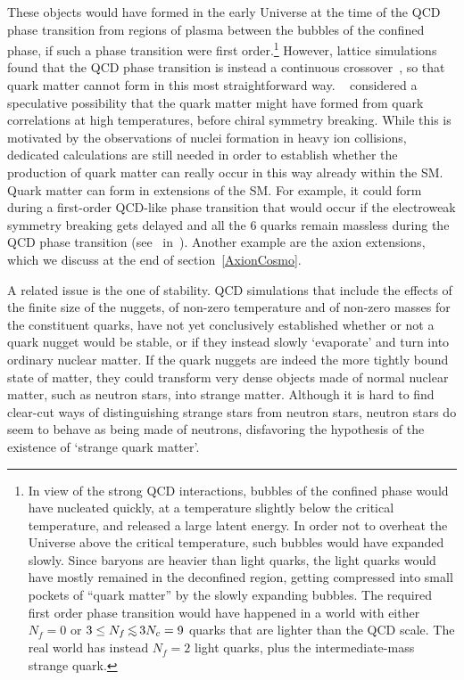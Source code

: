 These objects would have formed in the early Universe at the time of the QCD phase transition from regions of plasma between the bubbles of the confined phase, if such a phase transition were first order.\footnote{In view of the strong QCD interactions,
bubbles of the confined phase
would have nucleated quickly, at a temperature slightly below the critical temperature,
and released a large latent energy. In order not to overheat the Universe above  
the critical temperature, such bubbles would have expanded slowly.
Since baryons are heavier than light quarks, the light quarks would have mostly remained in the 
deconfined region, getting compressed into small pockets of ``quark matter'' by the slowly expanding bubbles.
The required first order phase transition would have happened in a world with either
 $N_f=0$ or $3\le N_f \circa{<}3N_c=9$ quarks that are lighter than the QCD scale.
The real world has instead $N_f=2$ light quarks, plus the intermediate-mass strange quark.}
However, lattice simulations found that the QCD phase transition is instead a continuous crossover~\cite{QballsBis}, so that quark matter cannot form in this most straightforward way. 
~\cite{QballsBis} considered a speculative possibility 
that the quark matter might have formed from quark correlations at high temperatures, before chiral symmetry breaking.
While this is motivated by the observations of nuclei formation in heavy ion collisions, dedicated calculations are still needed in order to establish whether the production of quark matter can really occur in this way already within the SM.
Quark matter can form in extensions of the SM.  For example, it could form during a first-order QCD-like phase transition that would occur if the
electroweak symmetry breaking gets delayed and all the 6 quarks remain massless during the QCD phase transition
(see ~in~\cite{QballsBis}). Another example are 
the axion extensions, which we discuss at the end of section~\ref{AxionCosmo}.

 


A related issue is the one of stability.
QCD simulations that include the effects of the finite size of the nuggets, of non-zero temperature and of non-zero masses for the constituent quarks, have not yet conclusively established whether or not a quark nugget would be stable, or if they instead slowly `evaporate' and turn into ordinary nuclear matter. If the quark nuggets are indeed the more tightly bound state of matter, they could transform very dense objects made of normal nuclear matter, such as neutron stars, into strange matter. Although it is hard to find clear-cut ways of distinguishing strange stars from neutron stars, neutron stars do seem to behave as being made of neutrons, disfavoring the hypothesis of the existence of `strange quark matter'.

